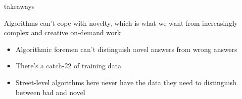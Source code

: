 \documentclass[presentation]{subfiles}
\begin{document}
\begin{frame}

\end{frame}

\begin{frame}{takeaways}
  
Algorithms can't cope with novelty, which is what we want from increasingly complex and creative on-demand work

\begin{itemize}
  \item Algorithmic foremen can't distinguish novel answers from wrong answers
  \item There's a catch-22 of training data
  \item Street-level algorithms here never have the data they need to distinguish between bad and novel
\end{itemize}

\end{frame}
\end{document}
